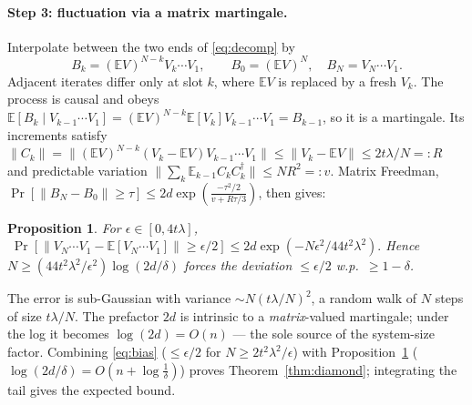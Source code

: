 ﻿\documentclass[12pt]{article}
\theoremstyle{plain}
\newtheorem{proposition}{Proposition}
\theoremstyle{definition}
\newcommand{\norm}[1]{\lVert #1 \rVert}
\newcommand{\E}{\mathbb{E}}
\begin{document}
	\paragraph{Step 3: fluctuation via a matrix martingale.}
	Interpolate between the two ends of \eqref{eq:decomp} by
	\begin{equation}
		B_k=(\E V)^{N-k}V_k\cdots V_1,\qquad B_0=(\E V)^N,\quad B_N=V_N\cdots V_1 .
		\label{eq:mart}
	\end{equation}
	Adjacent iterates differ only at slot $k$, where $\E V$ is replaced by a fresh $V_k$. The
	process is causal and obeys $\E[B_k\mid V_{k-1}\cdots V_1]=(\E V)^{N-k}\E[V_k]V_{k-1}\cdots V_1=B_{k-1}$,
	so it is a martingale. Its increments satisfy
	$\norm{C_k}=\norm{(\E V)^{N-k}(V_k-\E V)V_{k-1}\cdots V_1}\le\norm{V_k-\E V}\le2t\lambda/N=:R$
	and predictable variation $\norm{\sum_k\E_{k-1}C_kC_k^\dagger}\le NR^2=:v$. Matrix Freedman,
	$\operatorname{Pr}[\norm{B_N-B_0}\ge\tau]\le2d\exp(\tfrac{-\tau^2/2}{v+R\tau/3})$, then gives:
	
	\begin{proposition}\label{prop:fluct}
		For $\epsilon\in[0,4t\lambda]$,
		$\;\operatorname{Pr}[\norm{V_N\cdots V_1-\E[V_N\cdots V_1]}\ge\epsilon/2]\le2d\exp(-N\epsilon^2/44t^2\lambda^2).$
		Hence $N\ge(44t^2\lambda^2/\epsilon^2)\log(2d/\delta)$ forces the deviation $\le\epsilon/2$ w.p.\ $\ge1-\delta$.
	\end{proposition}
	
	The error is sub-Gaussian with variance $\sim N(t\lambda/N)^2$, a random walk of $N$ steps of
	size $t\lambda/N$. The prefactor $2d$ is intrinsic to a \emph{matrix}-valued martingale; under
	the log it becomes $\log(2d)=O(n)$ --- the sole source of the system-size factor. Combining
	\eqref{eq:bias} ($\le\epsilon/2$ for $N\ge2t^2\lambda^2/\epsilon$) with
	Proposition~\ref{prop:fluct} ($\log(2d/\delta)=O(n+\log\tfrac1\delta)$) proves
	Theorem~\ref{thm:diamond}; integrating the tail gives the expected bound.
	
\end{document}
